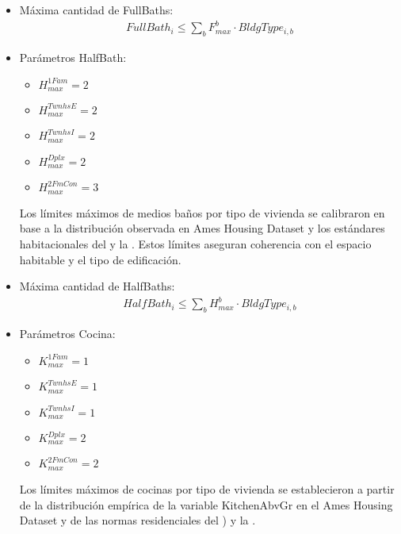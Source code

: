 \begin{itemize}
\begin{itemize}
    \item {Máxima cantidad de FullBaths:}
\begin{align}
        FullBath_{i} \leq \sum_{b} F_{max}^{b} \cdot BldgType_{i,b}
\end{align}
        \item Parámetros HalfBath:
        \begin{itemize}
            \item $H_{max}^{1Fam}=2$\\
            \item $H_{max}^{TwnhsE}=2$\\
            \item $H_{max}^{TwnhsI}=2$\\
            \item $H_{max}^{Dplx}=2$\\
            \item $H_{max}^{2FmCon}=3$
        \end{itemize}
Los límites máximos de medios baños por tipo de vivienda se calibraron en base a la distribución observada en Ames Housing Dataset \cite{decock2011} y los estándares habitacionales del \cite {HUD2022} y la \cite{NAHB2023}.
    Estos límites aseguran coherencia con el espacio habitable y el tipo de edificación.
    \item {Máxima cantidad de HalfBaths:}
    \begin{align}
        HalfBath_{i} \leq \sum_{b} H_{max}^{b} \cdot BldgType_{i,b}
    \end{align}
        \item Parámetros Cocina:
        \begin{itemize}
            \item $K_{max}^{1Fam}=1$\\
            \item $K_{max}^{TwnhsE}=1$\\
            \item $K_{max}^{TwnhsI}=1$\\
            \item $K_{max}^{Dplx}=2$\\
            \item $K_{max}^{2FmCon}=2$
        \end{itemize}
    Los límites máximos de cocinas por tipo de vivienda se establecieron a partir de la distribución empírica de la variable KitchenAbvGr en el Ames Housing Dataset \cite{decock2011} y de las normas residenciales del \cite {HUD2022}) y la \cite{NAHB2023}.

\end{itemize}
\end{itemize}
